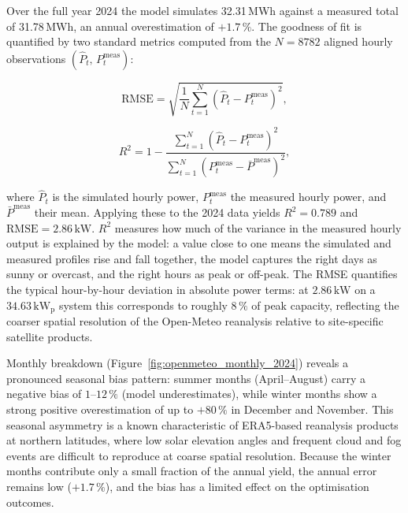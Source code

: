 \documentclass[11pt,a4paper]{report}
\begin{document}
Over the full year 2024 the model simulates 32.31\,MWh against a measured total of
31.78\,MWh, an annual overestimation of $+1.7\,\%$.
The goodness of fit is quantified by two standard metrics computed from the $N = 8782$
aligned hourly observations $(\hat{P}_t,\, P_t^\mathrm{meas})$:

\begin{equation}
    \mathrm{RMSE} = \sqrt{\frac{1}{N}\sum_{t=1}^{N}\!\left(\hat{P}_t - P_t^\mathrm{meas}\right)^2},
    \label{eq:rmse}
\end{equation}

\begin{equation}
    R^2 = 1 - \frac{\displaystyle\sum_{t=1}^{N}\!\left(\hat{P}_t - P_t^\mathrm{meas}\right)^2}
                   {\displaystyle\sum_{t=1}^{N}\!\left(P_t^\mathrm{meas} - \bar{P}^\mathrm{meas}\right)^2},
    \label{eq:r2}
\end{equation}

\noindent where $\hat{P}_t$ is the simulated hourly power, $P_t^\mathrm{meas}$ the
measured hourly power, and $\bar{P}^\mathrm{meas}$ their mean.
Applying these to the 2024 data yields $R^2 = 0.789$ and
$\mathrm{RMSE} = 2.86\,\mathrm{kW}$.
$R^2$ measures how much of the variance in the measured hourly output is explained by
the model: a value close to one means the simulated and measured profiles rise and fall
together, the model captures the right days as sunny or overcast, and the right hours
as peak or off-peak.
The RMSE quantifies the typical hour-by-hour deviation in absolute power terms: at
$2.86\,\mathrm{kW}$ on a $34.63\,\mathrm{kW_p}$ system this corresponds to roughly
$8\,\%$ of peak capacity, reflecting the coarser spatial resolution of the Open-Meteo
reanalysis relative to site-specific satellite products.

Monthly breakdown (Figure~\ref{fig:openmeteo_monthly_2024}) reveals a pronounced
seasonal bias pattern: summer months (April--August) carry a negative bias of
$1$--$12\,\%$ (model underestimates), while winter months show a strong positive
overestimation of up to $+80\,\%$ in December and November.
This seasonal asymmetry is a known characteristic of ERA5-based reanalysis products at
northern latitudes, where low solar elevation angles and frequent cloud and fog events
are difficult to reproduce at coarse spatial resolution.
Because the winter months contribute only a small fraction of the annual yield, the
annual error remains low ($+1.7\,\%$), and the bias has a limited effect on the
optimisation outcomes.
\end{document}
